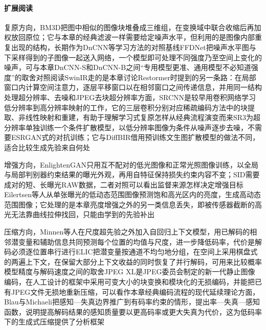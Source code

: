 \paragraph{扩展阅读}
复原方向，BM3D把图中相似的图像块堆叠成三维组，在变换域中联合收缩后再加权放回原位；它与本章的经典滤波一样需要给定噪声水平，但利用的是图像内部重复出现的结构，长期作为DnCNN等学习方法的对照基线FFDNet把噪声水平图与下采样得到的子图像一起送入网络，一个模型即可处理不同强度乃至空间上变化的噪声，可与本章DnCNN-S和DnCNN-B之间“专用模型更准、通用模型不必知道强度”的取舍对照阅读SwinIR走的是本章讨论Restormer时提到的另一条路：在局部窗口内计算空间注意力，逐层平移窗口以在相邻窗口之间传递信息，并用同一结构处理超分辨率、去噪和JPEG去块超分辨率方面，SRCNN是较早用卷积网络学习低分辨率到高分辨率映射的工作，它的三层卷积分别对应稀疏编码方法中的块提取、非线性映射和重建，有助于理解学习式复原怎样从经典流程演变而来SR3为超分辨率单独训练一个条件扩散模型，以低分辨率图像为条件从噪声逐步去噪，不需要ESRGAN式的对抗训练；它与DiffBIR借用预训练文生图扩散模型的做法不同，适合比较生成先验来自何处

增强方向，EnlightenGAN只用互不配对的低光图像和正常光照图像训练，以全局与局部判别器约束结果的曝光外观，再用自特征保持损失约束内容不变；SID需要成对的短、长曝光RAW数据，二者对照可以看出监督来源怎样决定增强目标Eilertsen等人从单张曝光的低动态范围图像预测饱和高光区内的亮度，生成高动态范围图像；它处理的是本章亮度增强之外的另一类信息丢失，即被传感器截断的高光无法靠曲线拉伸找回，只能由学到的先验补出

压缩方向，Minnen等人在尺度超先验之外加入自回归上下文模型，用已解码的相邻潜变量和辅助信息共同预测每个位置的均值与尺度，进一步降低码率，代价是解码必须逐位置串行进行ELIC把潜变量按通道不均匀地分组，在空间上采用棋盘式的两遍上下文，在保留大部分上下文收益的同时恢复了并行解码，可用来比较概率模型精度与解码速度之间的取舍JPEG XL是JPEG委员会制定的新一代静止图像编码，在人工设计的框架中采用可变大小的块变换和模块化的无损编码，并能把已有JPEG文件无损地重新压缩，可以看作本章经典编码流程的现代延续理论方面，Blau与Michaeli把感知—失真边界推广到有码率约束的情形，提出率—失真—感知函数，说明提高解码结果的感知质量要以更高码率或更大失真为代价，这为低码率下的生成式压缩提供了分析框架

